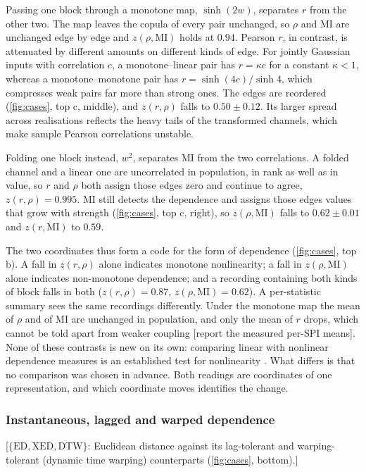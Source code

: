 \documentclass[pdflatex,sn-nature,iicol]{sn-jnl}
\newcommand{\will}[1]{\textcolor{mypurple}{[#1]}}
\newcommand{\will}[1]{}
\begin{document}
Passing one block through a monotone map, $\sinh(2w)$, separates $r$ from the other two. The map leaves the copula of every pair unchanged, so $\rho$ and MI are unchanged edge by edge and $z(\rho,\mathrm{MI})$ holds at $0.94$. Pearson $r$, in contrast, is attenuated by different amounts on different kinds of edge. For jointly Gaussian inputs with correlation $c$, a monotone--linear pair has $r = \kappa c$ for a constant $\kappa < 1$, whereas a monotone--monotone pair has $r = \sinh(4c)/\sinh 4$, which compresses weak pairs far more than strong ones. The edges are reordered (\cref{fig:cases}, top c, middle), and $z(r,\rho)$ falls to $0.50 \pm 0.12$. Its larger spread across realisations reflects the heavy tails of the transformed channels, which make sample Pearson correlations unstable.

Folding one block instead, $w^2$, separates MI from the two correlations. A folded channel and a linear one are uncorrelated in population, in rank as well as in value, so $r$ and $\rho$ both assign those edges zero and continue to agree, $z(r,\rho) = 0.995$. MI still detects the dependence and assigns those edges values that grow with strength (\cref{fig:cases}, top c, right), so $z(\rho,\mathrm{MI})$ falls to $0.62 \pm 0.01$ and $z(r,\mathrm{MI})$ to $0.59$.

The two coordinates thus form a code for the form of dependence (\cref{fig:cases}, top b). A fall in $z(r,\rho)$ alone indicates monotone nonlinearity; a fall in $z(\rho,\mathrm{MI})$ alone indicates non-monotone dependence; and a recording containing both kinds of block falls in both ($z(r,\rho) = 0.87$, $z(\rho,\mathrm{MI}) = 0.62$). A per-statistic summary sees the same recordings differently. Under the monotone map the mean of $\rho$ and of MI are unchanged in population, and only the mean of $r$ drops, which cannot be told apart from weaker coupling \will{report the measured per-SPI means}. None of these contrasts is new on its own: comparing linear with nonlinear dependence measures is an established test for nonlinearity \cite{palus1995testing,hlinka2011functional}. What differs is that no comparison was chosen in advance. Both readings are coordinates of one representation, and which coordinate moves identifies the change.

\subsubsection{Instantaneous, lagged and warped dependence}
\label{sec:cases-timing}
\will{$\{\mathrm{ED}, \mathrm{XED}, \mathrm{DTW}\}$: Euclidean distance against its lag-tolerant and warping-tolerant (dynamic time warping) counterparts (\cref{fig:cases}, bottom).}
\end{document}

